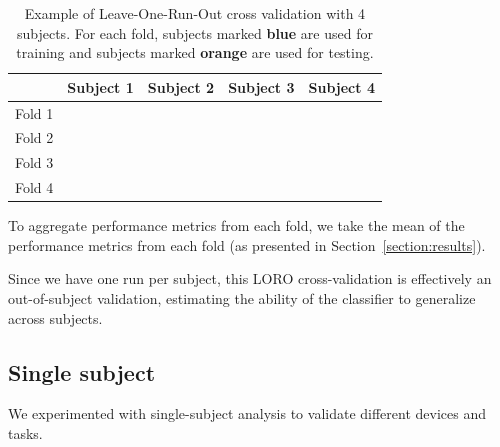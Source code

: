         \begin{table}[h]
            \centering
            \begin{tabular}{lcccc}
                \toprule
                       & Subject 1 & Subject 2 & Subject 3 & Subject 4 \\
                \midrule
                Fold 1 & \cellcolor{test}     & \multicolumn{3}{c}{\cellcolor{train}} \\
                Fold 2 & \cellcolor{train} & \cellcolor{test}     & \multicolumn{2}{c}{\cellcolor{train}     } \\
                Fold 3 & \multicolumn{2}{c}{\cellcolor{train}     } & \cellcolor{test}     & \cellcolor{train} \\
                Fold 4 & \multicolumn{3}{c}{\cellcolor{train}} & \cellcolor{test}     \\
                \bottomrule
            \end{tabular}
            \caption{Example of Leave-One-Run-Out cross validation with 4 subjects. For each fold, subjects marked \textcolor{train}{\textbf{blue}} are used for training and subjects marked \textcolor{BurntOrange}{\textbf{orange}} are used for testing.}\label{table:loro}
        \end{table}

        To aggregate performance metrics from each fold, we take the mean of the performance metrics from each fold (as presented in Section~\ref{section:results}).

        Since we have one run per subject, this LORO cross-validation is effectively an out-of-subject validation, estimating the ability of the classifier to generalize across subjects.

    \subsection{Single subject}

        We experimented with single-subject analysis to validate different devices and tasks.
